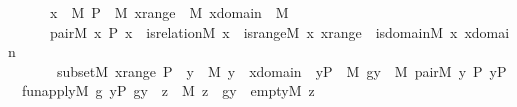 \begin{isabellebody}
\ \ \ \ \ \ {\isacharparenleft}{\kern0pt}{\isasymexists}x\ {\isasymin}\ M{\isachardot}{\kern0pt}\ {\isasymexists}P\ {\isasymin}\ M{\isachardot}{\kern0pt}\ {\isasymexists}xrange\ {\isasymin}\ M{\isachardot}{\kern0pt}\ {\isasymexists}xdomain\ {\isasymin}\ M{\isachardot}{\kern0pt}\isanewline
\ \ \ \ \ \ pair{\isacharparenleft}{\kern0pt}{\isacharhash}{\kern0pt}{\isacharhash}{\kern0pt}M{\isacharcomma}{\kern0pt}\ x{\isacharcomma}{\kern0pt}\ P{\isacharcomma}{\kern0pt}\ x{\isacharprime}{\kern0pt}{\isacharparenright}{\kern0pt}\ {\isasymand}\ is{\isacharunderscore}{\kern0pt}relation{\isacharparenleft}{\kern0pt}{\isacharhash}{\kern0pt}{\isacharhash}{\kern0pt}M{\isacharcomma}{\kern0pt}\ x{\isacharparenright}{\kern0pt}\ {\isasymand}\ is{\isacharunderscore}{\kern0pt}range{\isacharparenleft}{\kern0pt}{\isacharhash}{\kern0pt}{\isacharhash}{\kern0pt}M{\isacharcomma}{\kern0pt}\ x{\isacharcomma}{\kern0pt}\ xrange{\isacharparenright}{\kern0pt}\ {\isasymand}\ is{\isacharunderscore}{\kern0pt}domain{\isacharparenleft}{\kern0pt}{\isacharhash}{\kern0pt}{\isacharhash}{\kern0pt}M{\isacharcomma}{\kern0pt}\ x{\isacharcomma}{\kern0pt}\ xdomain{\isacharparenright}{\kern0pt}\ \isanewline
\ \ \ \ \ \ {\isasymand}\ subset{\isacharparenleft}{\kern0pt}{\isacharhash}{\kern0pt}{\isacharhash}{\kern0pt}M{\isacharcomma}{\kern0pt}\ xrange{\isacharcomma}{\kern0pt}\ P{\isacharparenright}{\kern0pt}\ {\isasymand}\ {\isacharparenleft}{\kern0pt}{\isasymforall}y\ {\isasymin}\ M{\isachardot}{\kern0pt}\ y\ {\isasymin}\ xdomain\ {\isasymlongrightarrow}\ {\isacharparenleft}{\kern0pt}{\isasymexists}y{\isacharunderscore}{\kern0pt}P\ {\isasymin}\ M{\isachardot}{\kern0pt}\ {\isasymexists}gy\ {\isasymin}\ M{\isachardot}{\kern0pt}\ pair{\isacharparenleft}{\kern0pt}{\isacharhash}{\kern0pt}{\isacharhash}{\kern0pt}M{\isacharcomma}{\kern0pt}\ y{\isacharcomma}{\kern0pt}\ P{\isacharcomma}{\kern0pt}\ y{\isacharunderscore}{\kern0pt}P{\isacharparenright}{\kern0pt}\ {\isasymand}\ fun{\isacharunderscore}{\kern0pt}apply{\isacharparenleft}{\kern0pt}{\isacharhash}{\kern0pt}{\isacharhash}{\kern0pt}M{\isacharcomma}{\kern0pt}\ g{\isacharcomma}{\kern0pt}\ y{\isacharunderscore}{\kern0pt}P{\isacharcomma}{\kern0pt}\ gy{\isacharparenright}{\kern0pt}\ {\isasymand}\ {\isacharparenleft}{\kern0pt}{\isasymforall}z\ {\isasymin}\ M{\isachardot}{\kern0pt}\ z\ {\isasymin}\ gy\ {\isasymlongleftrightarrow}\ empty{\isacharparenleft}{\kern0pt}{\isacharhash}{\kern0pt}{\isacharhash}{\kern0pt}M{\isacharcomma}{\kern0pt}\ z{\isacharparenright}{\kern0pt}{\isacharparenright}{\kern0pt}{\isacharparenright}{\kern0pt}{\isacharparenright}{\kern0pt}{\isacharparenright}{\kern0pt}{\isachardoublequoteclose}\isanewline

\end{isabellebody}
